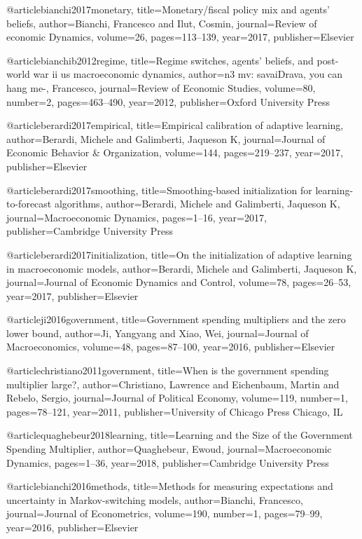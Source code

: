 @article{bianchi2017monetary,
  title={Monetary/fiscal policy mix and agents' beliefs},
  author={Bianchi, Francesco and Ilut, Cosmin},
  journal={Review of economic Dynamics},
  volume={26},
  pages={113--139},
  year={2017},
  publisher={Elsevier}
}

@article{bianchib2012regime,
  title={Regime switches, agents' beliefs, and post-world war ii us macroeconomic dynamics},
  author={n3 mv: savaiDrava, you can hang me-, Francesco},
  journal={Review of Economic Studies},
  volume={80},
  number={2},
  pages={463--490},
  year={2012},
  publisher={Oxford University Press}
}

@article{berardi2017empirical,
  title={Empirical calibration of adaptive learning},
  author={Berardi, Michele and Galimberti, Jaqueson K},
  journal={Journal of Economic Behavior \& Organization},
  volume={144},
  pages={219--237},
  year={2017},
  publisher={Elsevier}
}

@article{berardi2017smoothing,
  title={Smoothing-based initialization for learning-to-forecast algorithms},
  author={Berardi, Michele and Galimberti, Jaqueson K},
  journal={Macroeconomic Dynamics},
  pages={1--16},
  year={2017},
  publisher={Cambridge University Press}
}


@article{berardi2017initialization,
  title={On the initialization of adaptive learning in macroeconomic models},
  author={Berardi, Michele and Galimberti, Jaqueson K},
  journal={Journal of Economic Dynamics and Control},
  volume={78},
  pages={26--53},
  year={2017},
  publisher={Elsevier}
}


@article{ji2016government,
  title={Government spending multipliers and the zero lower bound},
  author={Ji, Yangyang and Xiao, Wei},
  journal={Journal of Macroeconomics},
  volume={48},
  pages={87--100},
  year={2016},
  publisher={Elsevier}
}

@article{christiano2011government,
  title={When is the government spending multiplier large?},
  author={Christiano, Lawrence and Eichenbaum, Martin and Rebelo, Sergio},
  journal={Journal of Political Economy},
  volume={119},
  number={1},
  pages={78--121},
  year={2011},
  publisher={University of Chicago Press Chicago, IL}
}

@article{quaghebeur2018learning,
  title={Learning and the Size of the Government Spending Multiplier},
  author={Quaghebeur, Ewoud},
  journal={Macroeconomic Dynamics},
  pages={1--36},
  year={2018},
  publisher={Cambridge University Press}
}

@article{bianchi2016methods,
  title={Methods for measuring expectations and uncertainty in Markov-switching models},
  author={Bianchi, Francesco},
  journal={Journal of Econometrics},
  volume={190},
  number={1},
  pages={79--99},
  year={2016},
  publisher={Elsevier}
}

